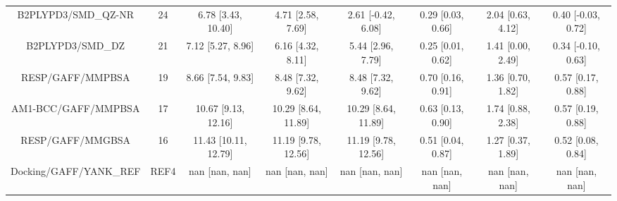 \documentclass[8pt]{article}
\begin{document}
\begin{center}
\begin{footnotesize}
\begin{longtable}{|cccccccc|}
                B2PLYPD3/SMD\_QZ-NR &    24 &    6.78 [3.43, 10.40] &    4.71 [2.58, 7.69] &    2.61 [-0.42, 6.08] &  0.29 [0.03, 0.66] &    2.04 [0.63, 4.12] &   0.40 [-0.03, 0.72] \\
                   B2PLYPD3/SMD\_DZ &    21 &     7.12 [5.27, 8.96] &    6.16 [4.32, 8.11] &     5.44 [2.96, 7.79] &  0.25 [0.01, 0.62] &    1.41 [0.00, 2.49] &   0.34 [-0.10, 0.63] \\
                   RESP/GAFF/MMPBSA &    19 &     8.66 [7.54, 9.83] &    8.48 [7.32, 9.62] &     8.48 [7.32, 9.62] &  0.70 [0.16, 0.91] &    1.36 [0.70, 1.82] &    0.57 [0.17, 0.88] \\
                AM1-BCC/GAFF/MMPBSA &    17 &   10.67 [9.13, 12.16] &  10.29 [8.64, 11.89] &   10.29 [8.64, 11.89] &  0.63 [0.13, 0.90] &    1.74 [0.88, 2.38] &    0.57 [0.19, 0.88] \\
                   RESP/GAFF/MMGBSA &    16 &  11.43 [10.11, 12.79] &  11.19 [9.78, 12.56] &   11.19 [9.78, 12.56] &  0.51 [0.04, 0.87] &    1.27 [0.37, 1.89] &    0.52 [0.08, 0.84] \\
             Docking/GAFF/YANK\_REF &  REF4 &        nan [nan, nan] &       nan [nan, nan] &        nan [nan, nan] &     nan [nan, nan] &       nan [nan, nan] &       nan [nan, nan] \\
\end{longtable}
\end{footnotesize}
\end{center}
\end{document}

